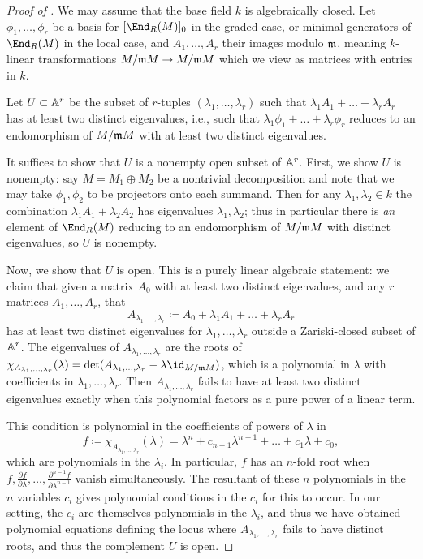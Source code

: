 \documentclass[12pt]{article}
\let\d\partial
\theoremstyle{theorem}
\numberwithin{thm}{section}
\theoremstyle{definition}
\begin{document}
\begin{proof}[Proof of ]
  We may assume that the base field $k$ is algebraically closed.
  Let $\phi_1,\dots,\phi_r$ be a basis for $[\End_R(M)]_0$ in the graded case, or minimal generators of $\End_R(M)$ in the local case, and $A_1,\dots,A_r$ their images modulo $\m$, meaning $k$-linear transformations $M/\m M\to M/\m M$ which we view as matrices with entries in $k$.

  Let $U\subset\AA^r$ be the subset of $r$-tuples $(\lambda_1,\dots,\lambda_r)$ such that $\lambda_1 A_1+\dots+\lambda_r A_r$ has at least two distinct eigenvalues, i.e., such that $\lambda_1\phi_1+\dots+\lambda_r\phi_r$ reduces to an endomorphism of $M/\m M$ with at least two distinct eigenvalues. %
\vadjust{\goodbreak}

  It suffices to show that $U$ is a nonempty open subset of $\AA^r$. First, we show $U$ is nonempty:
  say $M = M_1\oplus M_2$ be a nontrivial decomposition and note that we may take $\phi_1,\phi_2$ to be projectors onto each summand. Then for any $\lambda_1,\lambda_2\in k$ the combination $\lambda_1 A_1 + \lambda_2 A_2$ has eigenvalues $\lambda_1,\lambda_2$; thus in particular there is \emph{an} element of $\End_R(M)$ reducing to an endomorphism of $M/\m M$ with distinct eigenvalues, so $U$ is nonempty.

  Now, we show that $U$ is open. This is a purely linear algebraic statement: we claim that given a matrix $A_0$ with at least two distinct eigenvalues, and any $r$ matrices $A_1,\dots,A_r$, that
  $$ A_{\lambda_1,\dots,\lambda_r} \coloneqq A_0+\lambda_1 A_1+\dots+\lambda_r A_r $$
  has at least two distinct eigenvalues for $\lambda_1,\dots,\lambda_r$ outside a Zariski-closed subset of $\AA^r$.
  The eigenvalues of $A_{\lambda_1,\dots,\lambda_r}$ are the roots of $\chi_{A_{\lambda_1,\dots,\lambda_r}}(\lambda) = \det(A_{\lambda_1,\dots,\lambda_r}-\lambda \id_{M/\m M})$, which is a polynomial in $\lambda$ with coefficients in $\lambda_1,\dots,\lambda_r$. Then $A_{\lambda_1,\dots,\lambda_r}$ fails to have at least two distinct eigenvalues exactly when this polynomial factors as a pure power of a linear term.

  This condition is polynomial in the coefficients of powers of $\lambda$ in
  \[ f \coloneqq \chi_{A_{\lambda_1,\dots,\lambda_r}}(\lambda) = \lambda^n + c_{n-1} \lambda^{n-1} + \dots + c_1 \lambda + c_0, \]
  which are polynomials in the $\lambda_i$. In particular, $f$ has an $n$-fold root when
  $ f, \frac{\d f}{\d\lambda}, \dots, \frac{\d^{n-1}f}{\d\lambda^{n-1}}$ 
  vanish simultaneously. The resultant of these $n$ polynomials in the $n$ variables $c_i$ gives polynomial conditions in the $c_i$ for this to occur.
  In our setting, the $c_i$ are themselves polynomials in the $\lambda_i$, and thus we have obtained polynomial equations defining the locus where $A_{\lambda_1,\dots,\lambda_r}$ fails to have distinct roots, and thus the complement $U$ is open.
\end{proof}
\end{document}
